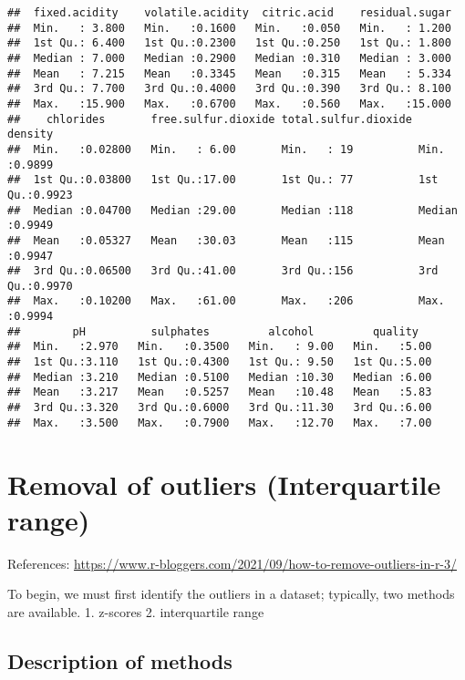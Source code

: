 \documentclass[
]{article}
\begin{document}
\begin{verbatim}
##  fixed.acidity    volatile.acidity  citric.acid    residual.sugar  
##  Min.   : 3.800   Min.   :0.1600   Min.   :0.050   Min.   : 1.200  
##  1st Qu.: 6.400   1st Qu.:0.2300   1st Qu.:0.250   1st Qu.: 1.800  
##  Median : 7.000   Median :0.2900   Median :0.310   Median : 3.000  
##  Mean   : 7.215   Mean   :0.3345   Mean   :0.315   Mean   : 5.334  
##  3rd Qu.: 7.700   3rd Qu.:0.4000   3rd Qu.:0.390   3rd Qu.: 8.100  
##  Max.   :15.900   Max.   :0.6700   Max.   :0.560   Max.   :15.000  
##    chlorides       free.sulfur.dioxide total.sulfur.dioxide    density      
##  Min.   :0.02800   Min.   : 6.00       Min.   : 19          Min.   :0.9899  
##  1st Qu.:0.03800   1st Qu.:17.00       1st Qu.: 77          1st Qu.:0.9923  
##  Median :0.04700   Median :29.00       Median :118          Median :0.9949  
##  Mean   :0.05327   Mean   :30.03       Mean   :115          Mean   :0.9947  
##  3rd Qu.:0.06500   3rd Qu.:41.00       3rd Qu.:156          3rd Qu.:0.9970  
##  Max.   :0.10200   Max.   :61.00       Max.   :206          Max.   :0.9994  
##        pH          sulphates         alcohol         quality    
##  Min.   :2.970   Min.   :0.3500   Min.   : 9.00   Min.   :5.00  
##  1st Qu.:3.110   1st Qu.:0.4300   1st Qu.: 9.50   1st Qu.:5.00  
##  Median :3.210   Median :0.5100   Median :10.30   Median :6.00  
##  Mean   :3.217   Mean   :0.5257   Mean   :10.48   Mean   :5.83  
##  3rd Qu.:3.320   3rd Qu.:0.6000   3rd Qu.:11.30   3rd Qu.:6.00  
##  Max.   :3.500   Max.   :0.7900   Max.   :12.70   Max.   :7.00
\end{verbatim}

\hypertarget{removal-of-outliers-interquartile-range}{%
\section{Removal of outliers (Interquartile
range)}\label{removal-of-outliers-interquartile-range}}

References:
\url{https://www.r-bloggers.com/2021/09/how-to-remove-outliers-in-r-3/}

To begin, we must first identify the outliers in a dataset; typically,
two methods are available. 1. z-scores 2. interquartile range

\hypertarget{description-of-methods}{%
\subsection{Description of methods}\label{description-of-methods}}
\end{document}
